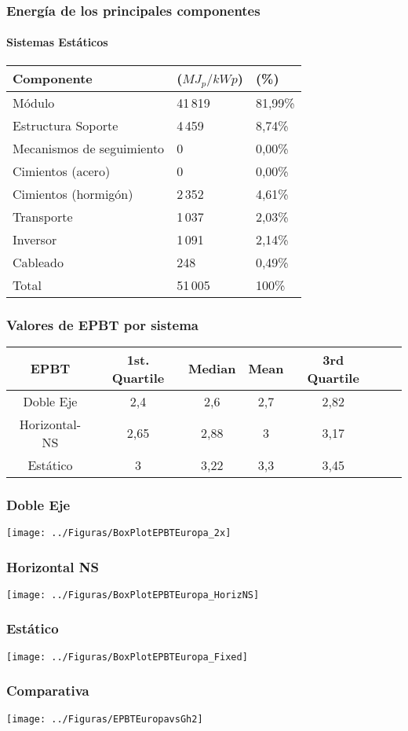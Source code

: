 \documentclass[serif, xcolor=dvipsnames]{beamer}
\begin{document}
\begin{frame}
  \frametitle{Energía de los principales componentes}
  \framesubtitle{Sistemas Estáticos}
  \begin{tabular}{lll}
    \toprule
    Componente              &  ($MJ_{p}/kWp$)  &  (\%)    \\
    \midrule
    Módulo & 41\,819 & 81,99\% \\
    Estructura Soporte      &  4\,459          &  8,74\%  \\
    Mecanismos de seguimiento    &  0               &  0,00\%  \\
    Cimientos (acero)     &  0               &  0,00\%  \\
    Cimientos (hormigón)  &  2\,352          &  4,61\%  \\
    Transporte              &  1\,037          &  2,03\%  \\
    Inversor               &  1\,091          &  2,14\%  \\
    Cableado                 &  248             &  0,49\%  \\
    \midrule
    Total                  &  51\,005         &  100\%   \\
    \bottomrule
  \end{tabular}
\end{frame}

\begin{frame}
  \frametitle{Valores de EPBT por sistema}
  \begin{tabular}{ccccccc}
    \toprule
    EPBT & 1st. Quartile & Median & Mean & 3rd Quartile \tabularnewline
    \midrule 
    Doble Eje & 2,4 & 2,6 & 2,7 & 2,82\tabularnewline
    Horizontal-NS &  2,65 & 2,88 & 3 & 3,17\tabularnewline
    Estático & 3 & 3,22 & 3,3 & 3,45\tabularnewline
    \bottomrule 
  \end{tabular}

\end{frame}

\begin{frame}
  \frametitle{Doble Eje}
  \texttt{[image: ../Figuras/BoxPlotEPBTEuropa\_2x]}
\end{frame}

\begin{frame}
  \frametitle{Horizontal NS}
  \texttt{[image: ../Figuras/BoxPlotEPBTEuropa\_HorizNS]}
\end{frame}

\begin{frame}
  \frametitle{Estático}
  \texttt{[image: ../Figuras/BoxPlotEPBTEuropa\_Fixed]}
\end{frame}

\begin{frame}
  \frametitle{Comparativa}
  \texttt{[image: ../Figuras/EPBTEuropavsGh2]}
\end{frame}
\end{document}
